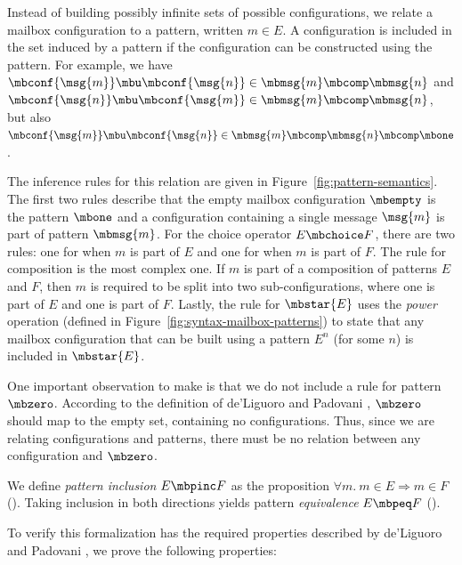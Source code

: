 Instead of building possibly infinite sets of possible configurations, we relate a mailbox configuration to a pattern, written $m \in E$.
A configuration is included in the set induced by a pattern if the configuration can be constructed using the pattern.
For example, we have $\mbconf{\msg{m}} \mbu \mbconf{\msg{n}} \in \mbmsg{m} \mbcomp \mbmsg{n}$ and $\mbconf{\msg{n}} \mbu \mbconf{\msg{m}} \in \mbmsg{m} \mbcomp \mbmsg{n}$,
but also $\mbconf{\msg{m}} \mbu \mbconf{\msg{n}} \in \mbmsg{m} \mbcomp \mbmsg{n} \mbcomp \mbone$.

The inference rules for this relation are given in Figure~\ref{fig:pattern-semantics}.
The first two rules describe that the empty mailbox configuration $\mbempty$ is the pattern $\mbone$ and a configuration containing a single message $\msg{m}$ is part of pattern $\mbmsg{m}$.
For the choice operator $E \mbchoice F$, there are two rules: one for when $m$ is part of $E$ and one for when $m$ is part of $F$.
The rule for composition is the most complex one.
If $m$ is part of a composition of patterns $E$ and $F$, then $m$ is required to be split into two sub-configurations, where one is part of $E$ and one is part of $F$.
Lastly, the rule for $\mbstar{E}$ uses the 
\emph{power} operation (defined in Figure~\ref{fig:syntax-mailbox-patterns})
to state that any mailbox configuration that can be built using a pattern $E^n$
(for some $n$) is included in $\mbstar{E}$.

One important observation to make is that we do not include a rule for pattern $\mbzero$.
According to the definition of de'Liguoro and Padovani \cite{deliguoroMailboxTypesUnordered2018}, $\mbzero$ should map to the empty set, containing no configurations.
Thus, since we are relating configurations and patterns, there must be no relation between any configuration and $\mbzero$.

We define \emph{pattern inclusion} $E \mbpinc F$ as the proposition $\forall m .\ m \in E \Rightarrow m \in F$ ().
Taking inclusion in both directions yields pattern \emph{equivalence} $E \mbpeq F$ ().

To verify this formalization has the required properties described by de'Liguoro and Padovani \cite{deliguoroMailboxTypesUnordered2018}, we prove
the following properties:

